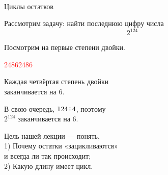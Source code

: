 \documentclass[17pt]{extarticle}
\def\divsby{\mathop{\rlap{.}\rlap{\raisebox{0.55ex}{.}}\raisebox{1.1ex}{.}}}
\newcommand{\tr}[1]{\textcolor{red}{#1}}
\begin{document}
\ \\ [1cm]

\begin{center} \Large Циклы остатков \end{center}

\newpage

Рассмотрим задачу: найти последнюю цифру числа
	\[ 2^{124} \]

Посмотрим на первые степени двойки.

\begin{center}
	\tr{2}\quad\tr{4}\quad\tr{8}\tr{6}\tr{2}\tr{4}\tr{8}\tr{6}
\end{center}

\newpage

Каждая четвёртая степень двойки \\ заканчивается на 6.

В свою очередь, $124 \divsby 4$, поэтому \\ $2^{124}$ заканчивается на 6. \bigskip

Цель нашей лекции — понять, \medskip \\
1) Почему остатки «зацикливаются» \\ и всегда ли так происходит; \medskip \\
2) Какую длину имеет цикл.
\end{document}

